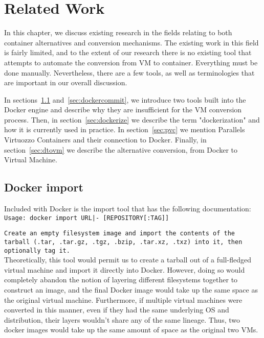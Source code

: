 \chapter{Related Work}
\label{chap:relatedwork}
In this chapter, we discuss existing research in the fields relating to both container alternatives and conversion mechanisms. The existing work in this field is fairly limited, and to the extent of our research there is no existing tool that attempts to automate the conversion from VM to container. Everything must be done manually. Nevertheless, there are a few tools, as well as terminologies that are important in our overall discussion.

In sections~\ref{sec:dockerimport} and~\ref{sec:dockercommit}, we introduce two tools built into the Docker engine and describe why they are insufficient for the VM conversion process. Then, in section~\ref{sec:dockerize} we describe the term "dockerization" and how it is currently used in practice. In section~\ref{sec:pvc} we mention Parallels Virtuozzo Containers and their connection to Docker. Finally, in section~\ref{sec:dtovm} we describe the alternative conversion, from Docker to Virtual Machine.

\section{Docker import}
\label{sec:dockerimport}
Included with Docker is the import tool that has the following documentation:\\

\texttt{Usage: docker import URL|- [REPOSITORY[:TAG]]}

\texttt{Create an empty filesystem image and import the contents of the tarball (.tar, .tar.gz, .tgz, .bzip, .tar.xz, .txz) into it, then optionally tag it.} \\

Theoretically, this tool would permit us to create a tarball out of a full-fledged virtual machine and import it directly into Docker. However, doing so would completely abandon the notion of layering different filesystems together to construct an image, and the final Docker image would take up the same space as the original virtual machine. Furthermore, if multiple virtual machines were converted in this manner, even if they had the same underlying OS and distribution, their layers wouldn't share any of the same lineage. Thus, two docker images would take up the same amount of space as the original two VMs. 

